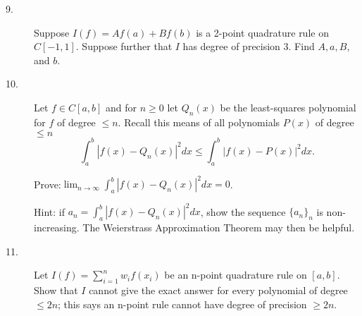 \documentclass{article}
\begin{document}
\begin{description}
\item[9.]
Suppose $I(f) = Af(a) + Bf(b)$ is a 2-point quadrature rule on $C[-1,1]$.
Suppose further that $I$ has degree of precision 3. Find $A, a, B$, and $b$.

\item[10.]
Let $f \in C[a,b]$ and for $n \geq 0$ let $Q_n(x)$ be the least-squares
polynomial for $f$ of degree $\leq n$. Recall this means of all polynomials
$P(x)$ of degree $\leq n$
$$\int^b_a |f(x) - Q_n(x)|^2 dx \leq \int^b_a |f(x) - P(x)|^2 dx.$$

Prove:$\lim_{n \to \infty} \int^b_a |f(x) - Q_n (x)|^2 dx = 0$.

Hint: if $a_n = \int^b_a |f(x) - Q_n(x)|^2 dx$, show the sequence
$\{a_n\}_n$ is non-increasing. The Weierstrass Approximation Theorem may then
be helpful.

\item[11.]
Let $I(f) = \sum^n_{i=1} w_i f(x_i)$ be an n-point quadrature rule on
$[a,b]$. Show that $I$ cannot give the exact answer for every polynomial
of degree $\leq 2n$; this says an n-point rule cannot have degree of
precision $\geq 2n$.




\end{description}    
\end{document}
